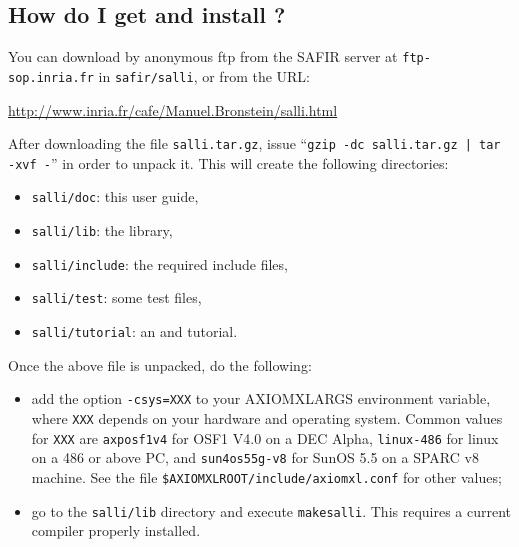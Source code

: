 \subsection*{How do I get and install \salli?}
You can download \salli by anonymous ftp from the SAFIR server at
{\tt ftp-sop.inria.fr} in {\tt safir/salli},
or from the URL:\\
\vspace{-5mm}
\begin{center}
\url{http://www.inria.fr/cafe/Manuel.Bronstein/salli.html}
\end{center}
After downloading the file {\tt salli.tar.gz}, issue
``{\tt gzip -dc salli.tar.gz | tar -xvf -}'' in order to unpack it.
This will create the following directories:
\begin{itemize}
\item{\tt salli/doc}: this user guide,
\item{\tt salli/lib}: the library,
\item{\tt salli/include}: the required include files,
\item{\tt salli/test}: some test files,
\item{\tt salli/tutorial}: an \aldor and \salli tutorial.
\end{itemize}
Once the above file is unpacked, do the following:
\begin{itemize}
\item add the option {\tt -csys=XXX} to your AXIOMXLARGS environment variable,
where {\tt XXX}
depends on your hardware and operating system. Common values for {\tt XXX}
are {\tt axposf1v4} for OSF1 V4.0 on a DEC Alpha, {\tt linux-486} for linux on
a 486 or above PC, and {\tt sun4os55g-v8} for SunOS 5.5 on a SPARC v8 machine.
See the file {\tt \$AXIOMXLROOT/include/axiomxl.conf} for other values;
\item go to the {\tt salli/lib} directory and execute {\tt makesalli}.
This requires a current \aldor compiler properly installed.
\end{itemize}

